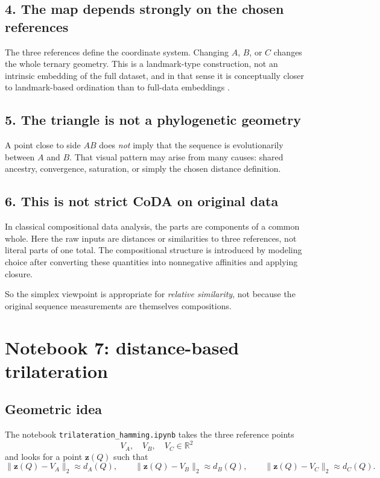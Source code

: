 \documentclass[11pt,a4paper]{article}
\begin{document}
\subsection{4. The map depends strongly on the chosen references}

The three references define the coordinate system. Changing $A$, $B$, or $C$ changes the whole ternary geometry. This is a landmark-type construction, not an intrinsic embedding of the full dataset, and in that sense it is conceptually closer to landmark-based ordination than to full-data embeddings \cite{DeSilva2004}.

\subsection{5. The triangle is not a phylogenetic geometry}

A point close to side $AB$ does \emph{not} imply that the sequence is evolutionarily between $A$ and $B$. That visual pattern may arise from many causes: shared ancestry, convergence, saturation, or simply the chosen distance definition.

\subsection{6. This is not strict CoDA on original data}

In classical compositional data analysis, the parts are components of a common whole. Here the raw inputs are distances or similarities to three references, not literal parts of one total. The compositional structure is introduced by modeling choice after converting these quantities into nonnegative affinities and applying closure.

So the simplex viewpoint is appropriate for \emph{relative similarity}, not because the original sequence measurements are themselves compositions.

\section{Notebook 7: distance-based trilateration}

\subsection{Geometric idea}

The notebook \texttt{trilateration\_hamming.ipynb} takes the three reference points
\[
V_A,\quad V_B,\quad V_C\in\mathbb{R}^2
\]
and looks for a point $\bm{z}(Q)$ such that
\[
\|\bm{z}(Q)-V_A\|_2\approx d_A(Q),\qquad
\|\bm{z}(Q)-V_B\|_2\approx d_B(Q),\qquad
\|\bm{z}(Q)-V_C\|_2\approx d_C(Q).
\]
\end{document}

